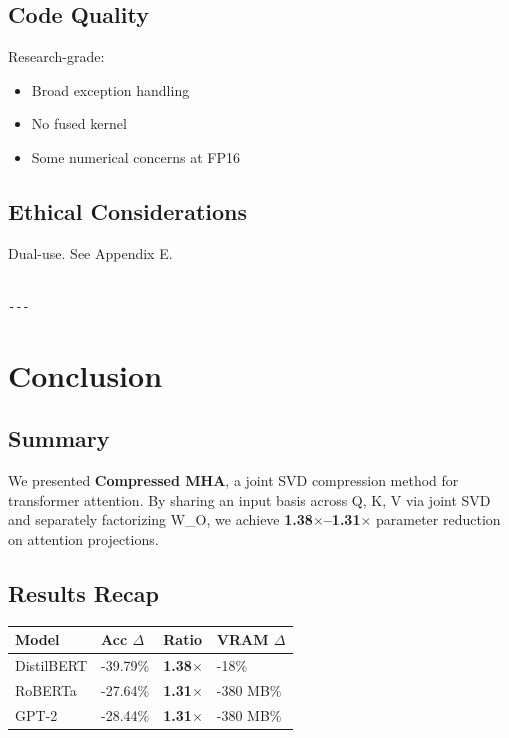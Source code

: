 \subsection{Code Quality}

Research-grade:
\begin{itemize}
\item Broad exception handling
\item No fused kernel
\item Some numerical concerns at FP16

\end{itemize}
\subsection{Ethical Considerations}

Dual-use. See Appendix E.
\begin{lstlisting}

---
\end{lstlisting}

\section{Conclusion}

\subsection{Summary}

We presented \textbf{Compressed MHA}, a joint SVD compression method for 
transformer attention. By sharing an input basis across Q, K, V via joint 
SVD and separately factorizing W\_O, we achieve \textbf{1.38$\times$--1.31$\times$} 
parameter reduction on attention projections.

\subsection{Results Recap}

\begin{table}[H]
\centering
\small
\begin{tabular}{llll}
\toprule
\textbf{Model} & \textbf{Acc $\Delta$} & \textbf{Ratio} & \textbf{VRAM $\Delta$} \\
\midrule
DistilBERT & -39.79\% & \textbf{1.38$\times$} & -18\% \\
RoBERTa & -27.64\% & \textbf{1.31$\times$} & -380 MB\% \\
GPT-2 & -28.44\% & \textbf{1.31$\times$} & -380 MB\% \\
\bottomrule
\end{tabular}
\end{table}

